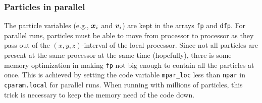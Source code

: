 \documentclass[\mydriver,12pt,twoside,notitlepage,a4paper]{article}
\newcommand{\code}[1]{\texttt{#1}}
\renewcommand{\vec}[1]{\mbox{\boldmath{$#1$}}}
\begin{document}
\subsubsection{Particles in parallel}

The particle variables (e.g., $\vec{x}_i$ and $\vec{v}_i$) are kept in the
arrays \code{fp} and \code{dfp}. For parallel runs, particles must be able to
move from processor to processor as they pass out of the $(x,y,z)$-interval of
the local processor. Since not all particles are present at the same processor
at the same time (hopefully), there is some memory optimization in making
\code{fp} not big enough to contain all the particles at once. This is achieved
by setting the code variable \code{mpar_loc} less than \code{npar} in
\code{cparam.local} for parallel runs. When running with millions of particles,
this trick is necessary to keep the memory need of the code down.
\end{document}

